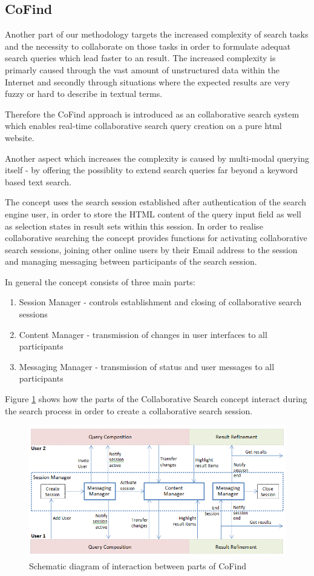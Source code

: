 \documentclass[runningheads,a4paper]{llncs} \usepackage[utf8]{inputenc}
\begin{document}
\subsection{CoFind}

Another part of our methodology targets the increased complexity of search
tasks and the necessity to collaborate on those tasks in order to formulate
adequat search queries which lead faster to an result. The increased complexity
is primarly caused through the vast amount of unstructured data within the
Internet and secondly through situations where the expected results are very
fuzzy or hard to describe in textual terms. 

Therefore the CoFind approach is introduced as an collaborative search system
which enables real-time collaborative search query creation on a pure html website.

Another aspect which increases the complexity is
caused by multi-modal querying itself - by offering the possiblity to extend
search queries far beyond a keyword based text search.

The concept uses the search session established after authentication of the
search engine user, in order to store the HTML content of the query input field
as well as selection states in result sets within this session. In order to
realise collaborative searching the concept provides functions for activating
collaborative search sessions, joining other online users by their Email address
to the session and managing messaging between participants of the search session.

In general the concept consists of three main parts:
\begin{enumerate}
  \item Session Manager - controls establishment and closing of collaborative
  search sessions
  \item Content Manager - transmission of changes in user interfaces to all
  participants
  \item Messaging Manager - transmission of status and user messages to all
  participants
\end{enumerate}

Figure \ref{fig:cofind} shows how the parts of the Collaborative Search concept
interact during the search process in order to create a collaborative search session.

\begin{figure}[h!]
  \centering
    \includegraphics[width=0.8\linewidth]{resources/cofind-workflow.png}
  \caption{Schematic diagram of interaction between parts of CoFind}
  \label{fig:cofind}
\end{figure}
 
\end{document}
